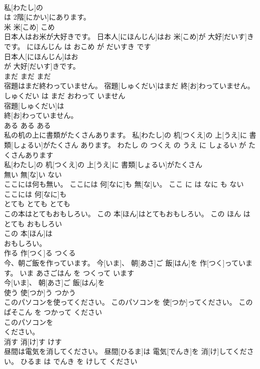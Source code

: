 \documentclass[8pt]{extreport}
\begin{document}
\begin{CJK}{UTF8}{min}
\\	私[わたし]の
\\	は 2階[にかい]にあります。		
\\	米	米[こめ]	こめ	
\\	日本人はお米が大好きです。	日本人[にほんじん]はお 米[こめ]が 大好[だいす]きです。	にほんじん は おこめ が だいすき です	
\\	日本人[にほんじん]はお
\\	が 大好[だいす]きです。		
\\	まだ	まだ	まだ	
\\	宿題はまだ終わっていません。	宿題[しゅくだい]はまだ 終[お]わっていません。	しゅくだい は まだ おわって いません	
\\	宿題[しゅくだい]は
\\	終[お]わっていません。		
\\	ある	ある	ある	
\\	私の机の上に書類がたくさんあります。	私[わたし]の 机[つくえ]の 上[うえ]に 書類[しょるい]がたくさん あります。	わたし の つくえ の うえ に しょるい が たくさんあります	
\\	私[わたし]の 机[つくえ]の 上[うえ]に 書類[しょるい]がたくさん
\\	無い	無[な]い	ない	
\\	ここには何も無い。	ここには 何[なに]も 無[な]い。	ここ に は なに も ない	
\\	ここには 何[なに]も
\\	とても	とても	とても	
\\	この本はとてもおもしろい。	この 本[ほん]はとてもおもしろい。	この ほん は とても おもしろい	
\\	この 本[ほん]は
\\	おもしろい。		
\\	作る	作[つく]る	つくる	
\\	今、朝ご飯を作っています。	今[いま]、 朝[あさ]ご 飯[はん]を 作[つく]っています。	いま あさごはん を つくって います	
\\	今[いま]、 朝[あさ]ご 飯[はん]を
\\	使う	使[つか]う	つかう	
\\	このパソコンを使ってください。	このパソコンを 使[つか]ってください。	この ぱそこん を つかって ください	
\\	このパソコンを
\\	ください。		
\\	消す	消[け]す	けす	
\\	昼間は電気を消してください。	昼間[ひるま]は 電気[でんき]を 消[け]してください。	ひるま は でんき を けして ください	

\end{CJK}
\end{document}

